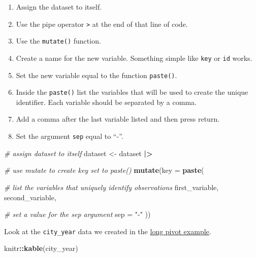 \documentclass[
]{book}
\newenvironment{Shaded}{\begin{snugshade}}{\end{snugshade}}
\newcommand{\AttributeTok}[1]{\textcolor[rgb]{0.13,0.29,0.53}{#1}}
\newcommand{\CommentTok}[1]{\textcolor[rgb]{0.56,0.35,0.01}{\textit{#1}}}
\newcommand{\FunctionTok}[1]{\textcolor[rgb]{0.13,0.29,0.53}{\textbf{#1}}}
\newcommand{\NormalTok}[1]{#1}
\newcommand{\OtherTok}[1]{\textcolor[rgb]{0.56,0.35,0.01}{#1}}
\newcommand{\SpecialCharTok}[1]{\textcolor[rgb]{0.81,0.36,0.00}{\textbf{#1}}}
\newcommand{\StringTok}[1]{\textcolor[rgb]{0.31,0.60,0.02}{#1}}
\providecommand{\tightlist}{%
  \setlength{\itemsep}{0pt}\setlength{\parskip}{0pt}}
\begin{document}
\begin{enumerate}
\def\labelenumi{\arabic{enumi}.}
\tightlist
\item
  Assign the dataset to itself.
\item
  Use the pipe operator \texttt{\textbar{}\textgreater{}} at the end of that line of code.
\item
  Use the \texttt{mutate()} function.
\item
  Create a name for the new variable. Something simple like \texttt{key} or \texttt{id} works.
\item
  Set the new variable equal to the function \texttt{paste()}.
\item
  Inside the \texttt{paste()} list the variables that will be used to create the unique identifier. Each variable should be separated by a comma.
\item
  Add a comma after the last variable listed and then press return.
\item
  Set the argument \texttt{sep} equal to ``-''.
\end{enumerate}

\begin{Shaded}
\begin{Highlighting}[]
\CommentTok{\# assign dataset to itself}
\NormalTok{dataset }\OtherTok{\textless{}{-}}\NormalTok{ dataset }\SpecialCharTok{|\textgreater{}}
  
  \CommentTok{\# use mutate to create \textasciigrave{}key\textasciigrave{} set to \textasciigrave{}paste()\textasciigrave{}}
  \FunctionTok{mutate}\NormalTok{(}\AttributeTok{key =} \FunctionTok{paste}\NormalTok{(}
    
    \CommentTok{\# list the variables that uniquely identify observations}
\NormalTok{    first\_variable,}
\NormalTok{    second\_variable,}
    
    \CommentTok{\# set a value for the \textasciigrave{}sep\textasciigrave{} argument}
    \AttributeTok{sep =} \StringTok{"{-}"}
\NormalTok{  ))}
\end{Highlighting}
\end{Shaded}

Look at the \texttt{city\_year} data we created in the \protect\hyperlink{pivot_long}{long pivot example}.

\begin{Shaded}
\begin{Highlighting}[]
\NormalTok{knitr}\SpecialCharTok{::}\FunctionTok{kable}\NormalTok{(city\_year)}
\end{Highlighting}
\end{Shaded}
\end{document}
